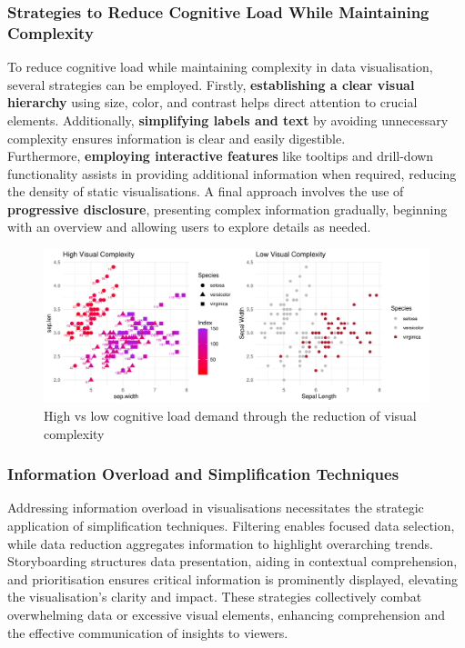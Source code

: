 \documentclass{article}\usepackage[]{graphicx}\usepackage[]{xcolor}
\makeatletter
\def\maxwidth{ %
  \ifdim\Gin@nat@width>\linewidth
    \linewidth
  \else
    \Gin@nat@width
  \fi
}
\newenvironment{knitrout}{}{} %
\makeatother
\begin{document}
\subsubsection{Strategies to Reduce Cognitive Load While Maintaining Complexity}
To reduce cognitive load while maintaining complexity in data visualisation, several strategies can be employed. Firstly, \textbf{establishing a clear visual hierarchy} using size, color, and contrast helps direct attention to crucial elements. Additionally, \textbf{simplifying labels and text} by avoiding unnecessary complexity ensures information is clear and easily digestible.\\
\noindent Furthermore, \textbf{employing interactive features} like tooltips and drill-down functionality assists in providing additional information when required, reducing the density of static visualisations. A final approach involves the use of \textbf{progressive disclosure}, presenting complex information gradually, beginning with an overview and allowing users to explore details as needed.\\

\begin{knitrout}\scriptsize
{}\color{fgcolor}\begin{figure}[H]

{\centering \includegraphics[width=\maxwidth]{figure/beamer-cogload-plot-1} 

}

\caption[High vs low cognitive load demand through the reduction of visual complexity]{High vs low cognitive load demand through the reduction of visual complexity}\label{fig:cogload-plot}
\end{figure}

\end{knitrout}


\subsubsection{Information Overload and Simplification Techniques}
Addressing information overload in visualisations necessitates the strategic application of simplification techniques. Filtering enables focused data selection, while data reduction aggregates information to highlight overarching trends. Storyboarding structures data presentation, aiding in contextual comprehension, and prioritisation ensures critical information is prominently displayed, elevating the visualisation's clarity and impact. These strategies collectively combat overwhelming data or excessive visual elements, enhancing comprehension and the effective communication of insights to viewers.
\end{document}

